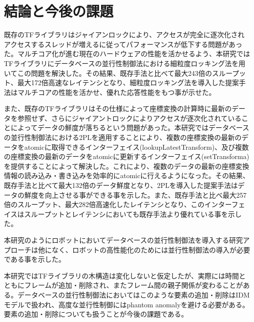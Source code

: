 \documentclass[a4paper]{jreport}	%
\begin{document}
\chapter{結論と今後の課題}

既存のTFライブラリはジャイアンロックにより、アクセスが完全に逐次化されアクセスするスレッドが増えるに従ってパフォーマンスが低下する問題があった。マルチコア化が進む現在のハードウェアの性能を活かせるよう、本研究ではTFライブラリにデータベースの並行性制御法における細粒度ロッキング法を用いてこの問題を解決した。その結果、既存手法と比べて最大243倍のスループット、最大172倍高速なレイテンシとなり、細粒度ロッキング法を導入した提案手法はマルチコアの性能を活かせ、優れた応答性能をもつ事が示せた。


また、既存のTFライブラリはその仕様によって座標変換の計算時に最新のデータを参照せず、さらにジャイアントロックによりアクセスが逐次化されていることによってデータの鮮度が落ちるという問題があった。本研究ではデータベースの並行性制御法における2PLを適用することにより、複数の座標変換の最新のデータをatomicに取得できるインターフェイス(lookupLatestTransform)、及び複数の座標変換の最新のデータをatomicに更新するインターフェイス(setTransforma)を提供することによって解決した。これにより、複数のデータの最新の座標変換情報の読み込み・書き込みを効率的にatomicに行えるようになった。その結果、既存手法と比べて最大132倍のデータ鮮度となり、2PLを導入した提案手法はデータの鮮度を向上させる事ができる事を示した。また、既存手法と比べ最大257倍のスループット、最大282倍高速化したレイテンシとなり、このインターフェイスはスループットとレイテンシにおいても既存手法より優れている事を示した。

本研究のようにロボットにおいてデータベースの並行性制御法を導入する研究アプローチは他になく、ロボットの高性能化のためには並行性制御法の導入が必要である事を示した。

本研究ではTFライブラリの木構造は変化しないと仮定したが、実際には時間とともにフレームが追加・削除され、またフレーム間の親子関係が変わることがある。データベースの並行性制御法においてはこのような要素の追加・削除はIDMモデルで扱われ、高度な並行性制御にはphantom anomalyを避ける必要がある。要素の追加・削除についても扱うことが今後の課題である。
\end{document}

